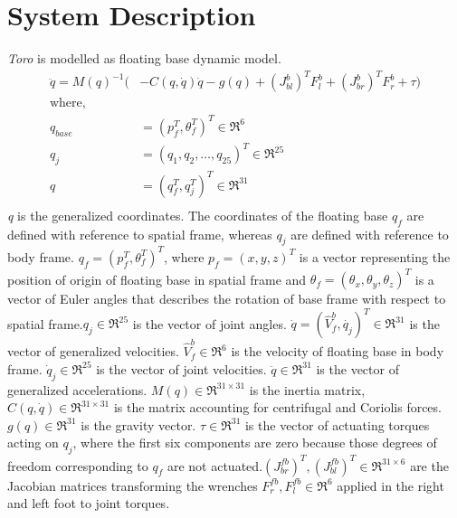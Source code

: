 \documentclass[12pt]{article}
\begin{document}
\newpage
\section{System Description}
\emph{Toro} is modelled as floating base dynamic model.
\begin{equation}
	\label{eq:motion}
	\begin{split}
	\ddot{q} = M(q)^{-1}(&-C(q,\dot{q})\dot{q} - g(q) + (J_{bl}^{b})^{T}F_{l}^{b} +(J_{br}^{b})^{T}F_{r}^{b} + \tau) \\
	\text{where,}\\
	q_{base} &= (p_{f}^{T},\theta_{f}^{T})^{T} \in \Re^{6} \\
	q_{j} &= (q_{1},q_{2},\ldots , q_{25})^{T} \in \Re^{25}\\
	q &= (q_{f}^{T}, q_{j}^{T})^{T} \in \Re^{31}\\
	\end{split}
\end{equation}
\emph{q} is the generalized coordinates. The coordinates of the floating base $q_{f}$ are defined with reference to spatial frame, whereas $q_{j}$ are defined with reference to body frame. $q_{f} = (p_{f}^{T},\theta_{f}^{T})^{T}$, where $p_{f}=(x,y,z)^{T}$ is a vector representing  the position of origin of floating base in spatial frame and $\theta_{f}=(\theta_{x},\theta_{y},\theta_{z})^{T}$ is a vector of Euler angles that describes the rotation of base frame with respect to spatial frame.$q_{j} \in \Re^{25}$ is the vector of joint angles. $\dot{q} =  (\hat{V}_{f}^{b},\dot{q_{j}})^{T} \in \Re^{31}$ is the vector of generalized velocities. $\hat{V}_{f}^{b} \in \Re^{6}$ is the velocity of floating base in body frame. $\dot{q}_{j} \in \Re^{25}$ is the vector of joint velocities. $\ddot{q}\in \Re^{31}$ is the vector of generalized accelerations. $M(q)\in \Re^{31 \times 31}$ is the inertia matrix, $C(q,\dot{q})\in \Re^{31 \times 31}$ is the matrix accounting for centrifugal and Coriolis forces. $g(q) \in \Re^{31}$ is the gravity vector. $\tau \in \Re^{31}$ is the vector of actuating torques acting on $q_{j}$, where the first six components are zero because those degrees of freedom corresponding to $q_{f}$ are not actuated.$(J_{br}^{fb})^{T},(J_{bl}^{fb})^{T} \in \Re^{31 \times 6}$ are the Jacobian matrices transforming the wrenches $F_{r}^{fb},F_{l}^{fb} \in \Re^{6}$ applied in the right and left foot to joint torques.
\end{document}
